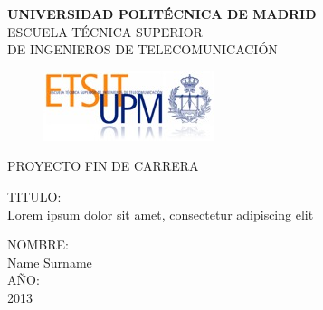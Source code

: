 \begin{center}
\thispagestyle{empty}
\textbf{\Large UNIVERSIDAD POLIT\'{E}CNICA DE MADRID}\\
\vspace*{1cm}
\large ESCUELA T\'{E}CNICA SUPERIOR\\DE INGENIEROS DE TELECOMUNICACI\'{O}N\\

\begin{figure}[h]
\centering
\includegraphics[scale=4]{./etsitlogo.jpg}
\end{figure}

\Large PROYECTO FIN DE CARRERA

\vspace*{2cm}
\Large TITULO:\\
\large Lorem ipsum dolor sit amet, consectetur adipiscing elit

\vspace*{5cm}
\Large NOMBRE:\\
\large Name Surname\\
\vspace*{1cm}
\Large A\~{N}O:\\
\large 2013
\end{center}

\pagebreak

\newpage
\thispagestyle{empty}
\mbox{}
\pagebreak